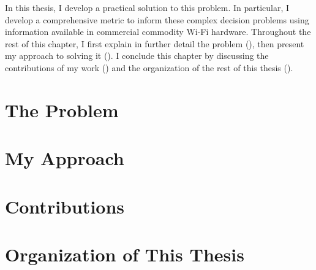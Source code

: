 In this thesis, I develop a practical solution to this problem. In particular, I develop a comprehensive metric to inform these complex decision problems using information available in commercial commodity Wi-Fi hardware. Throughout the rest of this chapter, I first explain in further detail the problem (), then present my approach to solving it (). I conclude this chapter by discussing the contributions of my work () and the organization of the rest of this thesis ().

\section{The Problem}
\label{sec:intro_problem}

\section{My Approach}
\label{sec:intro_approach}

\section{Contributions}
\label{sec:intro_contributions}

\section{Organization of This Thesis}
\label{sec:intro_organization}

\ifx\mainfile\undefined

\fi
